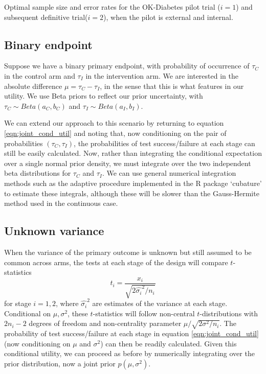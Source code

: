 \documentclass[sagev, Crown]{sagej} %
\begin{document}
\begin{table}
\small\sf\centering
\caption{Optimal sample size and error rates for the OK-Diabetes pilot trial ($i = 1$) and subsequent definitive trial($i = 2$), when the pilot is external and internal.}

\label{tab:ill_int}
\end{table}



\subsection{Binary endpoint}

Suppose we have a binary primary endpoint, with probability of occurrence of $\tau_C$ in the control arm and $\tau_I$ in the intervention arm. We are interested in the absolute difference $\mu = \tau_C - \tau_I$, in the sense that this is what features in our utility. We use Beta priors to reflect our prior uncertainty, with $\tau_C \sim Beta(a_C, b_C)$ and $\tau_I \sim Beta(a_I, b_I)$.

We can extend our approach to this scenario by returning to equation \ref{eqn:joint_cond_util} and noting that, now conditioning on the pair of probabilities $(\tau_C, \tau_I)$, the probabilities of test success/failure at each stage can still be easily calculated. Now, rather than integrating the conditional expectation over a single normal prior density, we must integrate over the two independent beta distributions for $\tau_C$ and $\tau_I$. We can use general numerical integration methods such as the adaptive procedure implemented in the R package `cubature' \cite{Narasimhan2018} to estimate these integrals, although these will be slower than the Gauss-Hermite method used in the continuous case.


\subsection{Unknown variance}

When the variance of the primary outcome is unknown but still assumed to be common across arms, the tests at each stage of the design will compare $t$-statistics
$$
t_i = \frac{x_i}{\sqrt{2\hat{\sigma_i}^2 / n_i}}
$$
for stage $i = 1,2$, where $\hat{\sigma_i}^2$ are estimates of the variance at each stage. Conditional on $\mu, \sigma^2$, these $t$-statistics will follow non-central $t$-distributions with $2n_i - 2$ degrees of freedom and non-centrality parameter $\mu/\sqrt{2\sigma^2 / n_i}$. The probability of test success/failure at each stage in equation \ref{eqn:joint_cond_util} (now conditioning on $\mu$ and $\sigma^2$) can then be readily calculated. Given this conditional utility, we can proceed as before by numerically integrating over the prior distribution, now a joint prior $p(\mu, \sigma^2)$.
\end{document}
